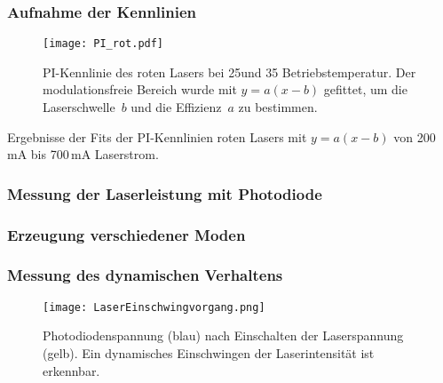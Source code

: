 \subsubsection{Aufnahme der Kennlinien}


\begin{figure}[H]
\begin{center}
  \texttt{[image: PI\_rot.pdf]}
  \caption{PI-Kennlinie des roten Lasers bei 25\grad und 35\grad
  Betriebstemperatur. Der modulationsfreie Bereich wurde mit $y=a(x-b)$
  gefittet, um die Laserschwelle~$b$ und die Effizienz~$a$ zu bestimmen.}
  \label{img:PI_rot}
\end{center}
\end{figure}


\begin{table}[htb]
\caption{Ergebnisse der Fits der PI-Kennlinien roten Lasers mit $y=a(x-b)$ von 200\,mA bis
700\,mA Laserstrom.}

\label{tab:Fits_PI_rot}
\end{table}

\FloatBarrier

\subsubsection{Messung der Laserleistung mit Photodiode}



\subsubsection{Erzeugung verschiedener Moden}


\subsubsection{Messung des dynamischen Verhaltens}

\begin{figure}[H]
\begin{center}
  \texttt{[image: LaserEinschwingvorgang.png]}
  \caption{Photodiodenspannung (blau) nach Einschalten der Laserspannung (gelb).
  Ein dynamisches Einschwingen der Laserintensität ist erkennbar.}
  \label{img:Einschwingen}
\end{center}
\end{figure}